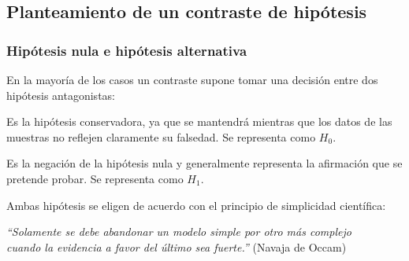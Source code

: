 \subsection{Planteamiento de un contraste de hipótesis}

\begin{frame}
\frametitle{Hipótesis nula e hipótesis alternativa}
En la mayoría de los casos un contraste supone tomar una decisión entre dos hipótesis antagonistas:

\pause
\begin{description}[<+->]
\item[Hipótesis nula] Es la hipótesis conservadora, ya que se mantendrá mientras que los datos de las muestras
no reflejen claramente su falsedad. Se representa como $H_0$.
\item[Hipótesis alternativa] Es la negación de la hipótesis nula y generalmente representa la afirmación que se
pretende probar. Se representa como $H_1$.
\end{description}
\pause
Ambas hipótesis se eligen de acuerdo con el principio de simplicidad científica:
\begin{center}
\emph{``Solamente se debe abandonar un modelo simple por otro más complejo\\
cuando la evidencia a favor del último sea fuerte.''} (Navaja de Occam)
\end{center}
\end{frame}


